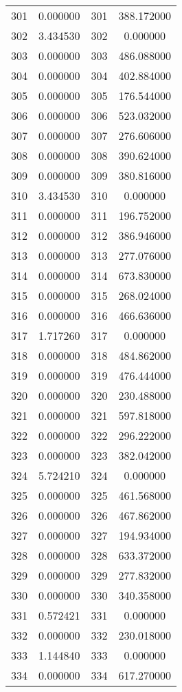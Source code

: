 \documentclass[12pt]{article}
\begin{document}
\begin{longtable}{@{}cccc@{}}
301 & 0.000000 & 301 & 388.172000 \\
302 & 3.434530 & 302 & 0.000000 \\
303 & 0.000000 & 303 & 486.088000 \\
304 & 0.000000 & 304 & 402.884000 \\
305 & 0.000000 & 305 & 176.544000 \\
306 & 0.000000 & 306 & 523.032000 \\
307 & 0.000000 & 307 & 276.606000 \\
308 & 0.000000 & 308 & 390.624000 \\
309 & 0.000000 & 309 & 380.816000 \\
310 & 3.434530 & 310 & 0.000000 \\
311 & 0.000000 & 311 & 196.752000 \\
312 & 0.000000 & 312 & 386.946000 \\
313 & 0.000000 & 313 & 277.076000 \\
314 & 0.000000 & 314 & 673.830000 \\
315 & 0.000000 & 315 & 268.024000 \\
316 & 0.000000 & 316 & 466.636000 \\
317 & 1.717260 & 317 & 0.000000 \\
318 & 0.000000 & 318 & 484.862000 \\
319 & 0.000000 & 319 & 476.444000 \\
320 & 0.000000 & 320 & 230.488000 \\
321 & 0.000000 & 321 & 597.818000 \\
322 & 0.000000 & 322 & 296.222000 \\
323 & 0.000000 & 323 & 382.042000 \\
324 & 5.724210 & 324 & 0.000000 \\
325 & 0.000000 & 325 & 461.568000 \\
326 & 0.000000 & 326 & 467.862000 \\
327 & 0.000000 & 327 & 194.934000 \\
328 & 0.000000 & 328 & 633.372000 \\
329 & 0.000000 & 329 & 277.832000 \\
330 & 0.000000 & 330 & 340.358000 \\
331 & 0.572421 & 331 & 0.000000 \\
332 & 0.000000 & 332 & 230.018000 \\
333 & 1.144840 & 333 & 0.000000 \\
334 & 0.000000 & 334 & 617.270000 \\

\end{longtable}
\end{document}
